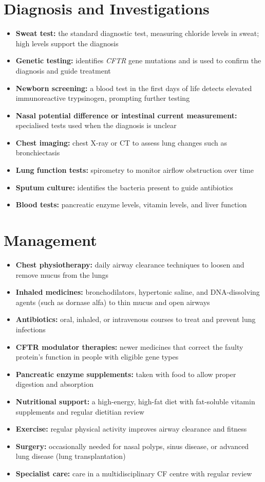 \section*{Diagnosis and Investigations}
\begin{itemize}
    \item \textbf{Sweat test:} the standard diagnostic test, measuring chloride levels in sweat; high levels support the diagnosis
    \item \textbf{Genetic testing:} identifies \textit{CFTR} gene mutations and is used to confirm the diagnosis and guide treatment
    \item \textbf{Newborn screening:} a blood test in the first days of life detects elevated immunoreactive trypsinogen, prompting further testing
    \item \textbf{Nasal potential difference or intestinal current measurement:} specialised tests used when the diagnosis is unclear
    \item \textbf{Chest imaging:} chest X-ray or CT to assess lung changes such as bronchiectasis
    \item \textbf{Lung function tests:} spirometry to monitor airflow obstruction over time
    \item \textbf{Sputum culture:} identifies the bacteria present to guide antibiotics
    \item \textbf{Blood tests:} pancreatic enzyme levels, vitamin levels, and liver function
\end{itemize}

\section*{Management}
\begin{itemize}
    \item \textbf{Chest physiotherapy:} daily airway clearance techniques to loosen and remove mucus from the lungs
    \item \textbf{Inhaled medicines:} bronchodilators, hypertonic saline, and DNA-dissolving agents (such as dornase alfa) to thin mucus and open airways
    \item \textbf{Antibiotics:} oral, inhaled, or intravenous courses to treat and prevent lung infections
    \item \textbf{CFTR modulator therapies:} newer medicines that correct the faulty protein's function in people with eligible gene types
    \item \textbf{Pancreatic enzyme supplements:} taken with food to allow proper digestion and absorption
    \item \textbf{Nutritional support:} a high-energy, high-fat diet with fat-soluble vitamin supplements and regular dietitian review
    \item \textbf{Exercise:} regular physical activity improves airway clearance and fitness
    \item \textbf{Surgery:} occasionally needed for nasal polyps, sinus disease, or advanced lung disease (lung transplantation)
    \item \textbf{Specialist care:} care in a multidisciplinary CF centre with regular review
\end{itemize}

